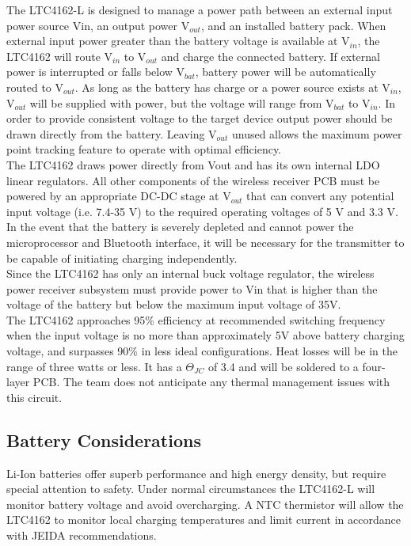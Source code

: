 \documentclass[12pt]{article}
\begin{document}
\indent \indent
The LTC4162-L is designed to manage a power path between an external input power source Vin, an output power V$_{out}$, and an installed battery pack. When external input power greater than the battery voltage is available at V$_{in}$, the LTC4162 will route V$_{in}$ to V$_{out}$ and charge the connected battery. If external power is interrupted or falls below V$_{bat}$, battery power will be automatically routed to V$_{out}$. As long as the battery has charge or a power source exists at V$_{in}$, V$_{out}$ will be supplied with power, but the voltage will range from V$_{bat}$ to V$_{in}$. In order to provide consistent voltage to the target device output power should be drawn directly from the battery. Leaving V$_{out}$ unused allows the maximum power point tracking feature to operate with optimal efficiency.\\

\indent
The LTC4162 draws power directly from Vout and has its own internal LDO linear regulators. All other components of the wireless receiver PCB must be powered by an appropriate DC-DC stage at V$_{out}$ that can convert any potential input voltage (i.e. 7.4-35 V) to the required operating voltages of 5 V and 3.3 V. In the event that the battery is severely depleted and cannot power the microprocessor and Bluetooth interface, it will be necessary for the transmitter to be capable of initiating charging independently.\\

\indent
Since the LTC4162 has only an internal buck voltage regulator, the wireless power receiver subsystem must provide power to Vin that is higher than the voltage of the battery but below the maximum input voltage of 35V.\\

\indent
The LTC4162 approaches 95\% efficiency at recommended switching frequency when the input voltage is no more than approximately 5V above battery charging voltage, and surpasses 90\% in less ideal configurations. Heat losses will be in the range of three watts or less. It has a $\Theta_{JC}$ of 3.4  and will be soldered to a four-layer PCB. The team does not anticipate any thermal management issues with this circuit.

\subsection{Battery Considerations}
\indent
Li-Ion batteries offer superb performance and high energy density, but require special attention to safety. Under normal circumstances the LTC4162-L will monitor battery voltage and avoid overcharging. A NTC thermistor will allow the LTC4162 to monitor local charging temperatures and limit current in accordance with JEIDA recommendations.\\
\end{document}
